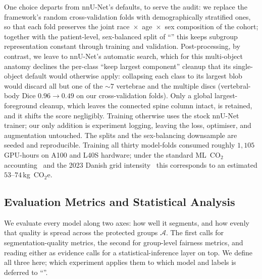 One choice departs from nnU-Net's defaults, to serve the audit: we replace the
framework's random cross-validation folds with demographically stratified ones, so that
each fold preserves the joint race~$\times$~age~$\times$~sex composition of the cohort;
together with the patient-level, sex-balanced split of ``'' this
keeps subgroup representation constant through training and validation. Post-processing,
by contrast, we leave to nnU-Net's automatic search, which for this multi-object anatomy
declines the per-class ``keep largest component'' cleanup that its single-object default
would otherwise apply: collapsing each class to its largest blob would discard all but one
of the ${\sim}7$ vertebrae and the multiple discs (vertebral-body Dice $0.96 \to 0.49$ on
our cross-validation folds). Only a global largest-foreground cleanup, which leaves the
connected spine column intact, is retained, and it shifts the score negligibly. Training
otherwise uses the stock nnU-Net trainer; our only addition is experiment logging, leaving
the loss, optimiser, and augmentation untouched. The splits and the sex-balancing
downsample are seeded and reproducible.
Training all thirty
model-folds consumed roughly $1{,}105$ GPU-hours
on A100 and L40S hardware; under the standard ML~CO$_2$
accounting~\cite{lacoste2019quantifying,strubell2019energy,patterson2021carbon} and the
2023 Danish grid intensity~\cite{dea_keyfigures2023} this corresponds to an estimated
$53$--$74$\,kg~CO$_2$e.

\subsection{Evaluation Metrics and Statistical Analysis}
\label{sec:metrics}

We evaluate every model along two axes: how well it segments, and how evenly that
quality is spread across the protected groups $\mathcal{A}$. The first calls for
segmentation-quality metrics, the second for group-level fairness metrics, and
reading either as evidence calls for a statistical-inference layer on top. We
define all three here; which experiment applies them to which model and labels is
deferred to ``''.

